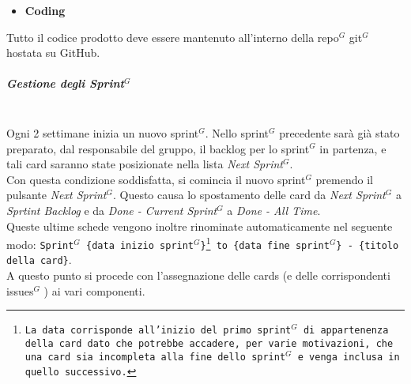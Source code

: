 \begin{itemize}
    \item \textbf{Coding}
\end{itemize}
Tutto il codice prodotto deve essere mantenuto all'interno della repo$^G$  git$^G$ hostata su GitHub.

\subparagraph{Gestione degli Sprint$^G$}
\mbox{}\\
Ogni 2 settimane inizia un nuovo sprint$^G$. Nello sprint$^G$ precedente sarà già stato preparato, dal responsabile del gruppo, il backlog per lo sprint$^G$ in partenza, e tali card saranno state posizionate nella lista \textit{Next Sprint}$^G$. \\
Con questa condizione soddisfatta, si comincia il nuovo sprint$^G$ premendo il pulsante \textit{Next Sprint}$^G$. Questo causa lo spostamento delle card da \textit{Next Sprint}$^G$ a \textit{Sprtint Backlog} e da \textit{Done - Current Sprint}$^G$ a \textit{Done - All Time}.\\
Queste ultime schede vengono inoltre rinominate automaticamente nel seguente modo: \texttt{Sprint$^G$ \{data inizio sprint$^G$\}\footnote{La data corrisponde all'inizio del primo sprint$^G$ di appartenenza della card dato che potrebbe accadere, per varie motivazioni, che una card sia incompleta alla fine dello sprint$^G$ e venga inclusa in quello successivo.} to \{data fine sprint$^G$\} - \{titolo della card\}}.\\
A questo punto si procede con l'assegnazione delle cards (e delle corrispondenti issues$^G$ ) ai vari componenti.

